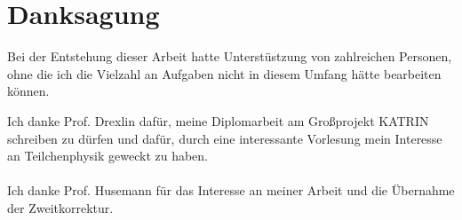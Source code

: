 \chapter*{Danksagung}
Bei der Entstehung dieser Arbeit hatte Unterst\"ustzung von zahlreichen Personen, ohne die ich die Vielzahl an Aufgaben nicht in diesem Umfang h\"atte bearbeiten k\"onnen.

Ich danke Prof. Drexlin daf\"ur, meine Diplomarbeit am Gro\ss projekt KATRIN schreiben zu d\"urfen und daf\"ur, durch eine interessante Vorlesung mein Interesse an Teilchenphysik geweckt zu haben.\\\\
Ich danke Prof. Husemann f\"ur das Interesse an meiner Arbeit und die \"Ubernahme der Zweitkorrektur.
